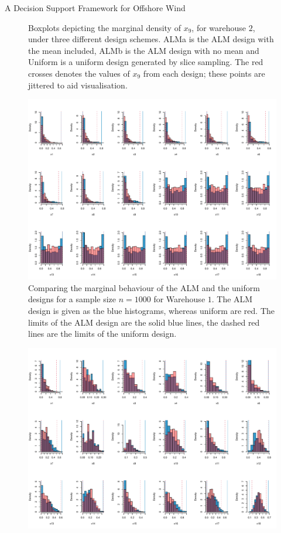 \begin{chapter}{A Decision Support Framework for Offshore Wind \label{Ch:ds-for-ow}}
\begin{figure}
 \caption{Boxplots depicting the marginal density of $x_9$, for warehouse $2$, under three different design schemes. ALMa is the ALM design with the mean included, ALMb is the ALM design with no mean and Uniform is a uniform design generated by slice sampling. The red crosses denotes the values of $x_9$ from each design; these points are jittered to aid visualisation. \label{Fig:compare-x9-2}}
\end{figure}
\begin{figure}
 \centering
 \includegraphics[width = 7.5in, angle = 90]{fig-ds/almnomean-vs-unif.pdf}
 \caption{Comparing the marginal behaviour of the ALM and the uniform designs for a sample size $n = 1000$ for Warehouse $1$. The ALM design is given as the blue histograms, whereas uniform are red. The limits of the ALM design are the solid blue lines, the dashed red lines are the limits of the uniform design.\label{Fig:alm-vs-unif}}
\end{figure}
\begin{figure}
 \centering
 \includegraphics[width = 7.5in, angle = 90]{fig-ds/almnomean-vs-unif2.pdf}

\end{figure}
\end{chapter}

